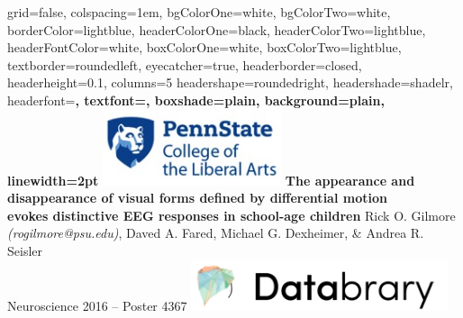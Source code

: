 \documentclass[landscape,final,paperwidth=72in,paperheight=40.5in,fontscale=0.285]{baposter}
\begin{document}



\begin{poster}%
  {
  grid=false,
  colspacing=1em,
  bgColorOne=white,
  bgColorTwo=white,
  borderColor=lightblue,
  headerColorOne=black,
  headerColorTwo=lightblue,
  headerFontColor=white,
  boxColorOne=white,
  boxColorTwo=lightblue,
  textborder=roundedleft,
  eyecatcher=true,
  headerborder=closed,
  headerheight=0.1\textheight,
  columns=5 %
  headershape=roundedright,
  headershade=shadelr,
  headerfont=\Large\bf\textsc, %
  textfont={\setlength{\parindent}{1.5em}},
  boxshade=plain,
  background=plain,
  linewidth=2pt
  }
  {\includegraphics[height=6em]{img/penn_state_cla_logo_new_210-89.jpg}}
  {\bf{The appearance and disappearance of visual forms defined by differential motion \\evokes distinctive EEG responses in school-age children}\vspace{0.2em}}
  {Rick O. Gilmore \emph{(rogilmore@psu.edu)}, Daved A. Fared, Michael G. Dexheimer, \& Andrea R. Seisler\\ \vspace{0.2em}
  Neuroscience 2016 -- Poster 4367}
  {\includegraphics[height=4em]{img/databrary.png}}


\end{poster}
\end{document}
